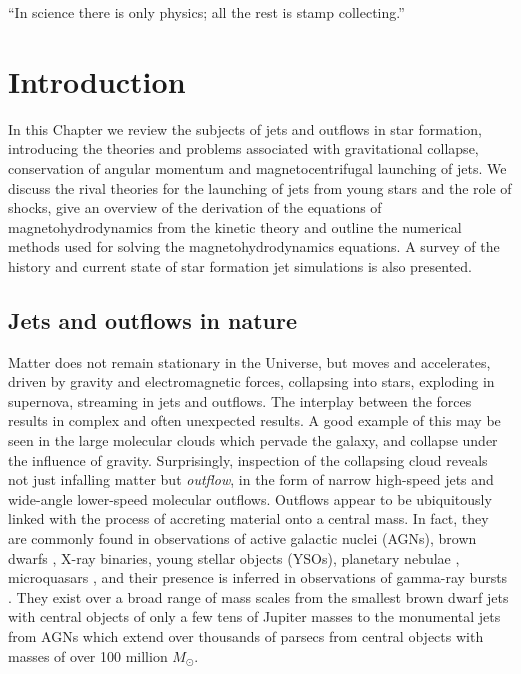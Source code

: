 \begin{savequote} ``In science there is only physics; all the rest is stamp collecting.''
\end{savequote}

\chapter{Introduction}

In this Chapter we review the subjects of jets and outflows in star formation,
introducing the theories and problems associated with gravitational collapse,
conservation of angular momentum and magnetocentrifugal launching of jets.
We discuss the rival theories for the launching of jets from young stars and the
role of shocks, give an overview of the derivation of the equations of
magnetohydrodynamics from the kinetic theory and outline the numerical methods
used for solving the magnetohydrodynamics equations. A survey of the history
and current state of star formation jet simulations is also presented.


\section{Jets and outflows in nature}

Matter does not remain stationary in the Universe, but moves and accelerates, driven by gravity and electromagnetic forces, collapsing into stars, exploding in supernova, streaming in jets and outflows. 
The interplay between the forces results in complex and often unexpected results. 
A good example of this may be seen in the large molecular clouds which pervade the galaxy, and collapse under the influence of gravity.
Surprisingly, inspection of the collapsing cloud reveals not just infalling matter but \emph{outflow}, in the form of narrow high-speed jets and wide-angle lower-speed molecular outflows.
Outflows appear to be ubiquitously linked with the process of accreting material onto a central mass. 
In fact, they are commonly found in observations of active galactic nuclei
(AGNs), brown dwarfs \citep{2005Natur.435..652W}, X-ray binaries, young stellar
objects (YSOs), planetary nebulae \citep[PN;][]{2006Natur.440...58V}, microquasars \citep{2002A&A...393L..99P}, 
and their presence is inferred in observations of gamma-ray bursts \citep[GRB;][]{2006A&A...455..423M}. 
They exist over a broad range of mass scales from the smallest brown dwarf jets with central objects of only a few tens of Jupiter masses to the monumental jets from AGNs which extend over thousands of parsecs from central objects with masses of over 100 million $M_{\odot}$.




